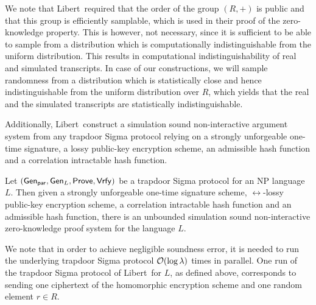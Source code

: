 \begin{remark}
We note that Libert~\etal required that the order of the group $(R,+)$ is public and that this group is efficiently samplable, which is used in their proof of the zero-knowledge property. This is however, not necessary, since it is sufficient to be able to sample from a distribution which is computationally indistinguishable from the uniform distribution. This results in computational indistinguishability of real and simulated transcripts. In case of our constructions, we will sample randomness from a distribution which is statistically close and hence indistinguishable from the uniform distribution over $R$, which yields that the real and the simulated transcripts are statistically indistinguishable. 
\end{remark}

Additionally, Libert~\etal construct a simulation sound non-interactive argument system from any trapdoor Sigma protocol relying on a strongly unforgeable one-time signature, a lossy public-key encryption scheme, an admissible hash function and a correlation intractable hash function. 

\begin{theorem}\label{thm:nizk}
Let $(\mathsf{Gen}_{\mathsf{par}}, \mathsf{Gen}_L, \mathsf{Prove}, \mathsf{Vrfy})$ be a trapdoor Sigma protocol for an NP language $L$. Then given a strongly unforgeable one-time signature scheme, $\rel$-lossy public-key encryption scheme, a correlation intractable hash function and an admissible hash function, there is an unbounded simulation sound non-interactive zero-knowledge proof system for the language $L$. 
\end{theorem}

We note that in order to achieve negligible soundness error, it is needed to run the underlying trapdoor Sigma protocol $\mathcal{O}(\log \lambda)$ times in parallel. One run of the trapdoor Sigma protocol of Libert~\etal for $L$, as defined above, corresponds to sending one ciphertext of the homomorphic encryption scheme and one random element $r \in R$.

